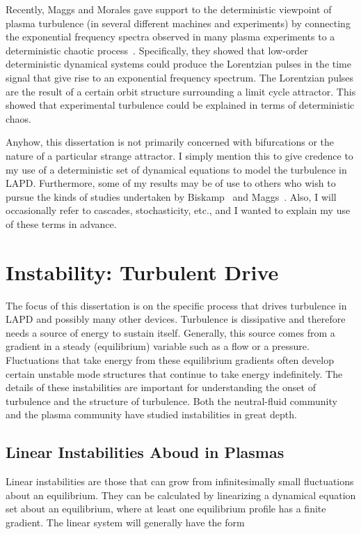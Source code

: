 Recently, Maggs and Morales gave support to the deterministic viewpoint of plasma turbulence (in several different machines and experiments) by connecting the exponential frequency spectra
observed in many plasma experiments to a deterministic chaotic process~\cite{maggs2011,maggs2012a,maggs2012b}. Specifically, they showed that low-order deterministic dynamical systems could
produce the Lorentzian pulses in the time signal that give rise to an exponential frequency spectrum. The Lorentzian pulses are the result of a certain orbit structure surrounding
a limit cycle attractor. This showed that experimental turbulence could be explained in terms of deterministic chaos.

Anyhow, this dissertation is not primarily concerned with bifurcations or the nature of a particular strange attractor. I simply mention this to give credence to my use of a deterministic set
of dynamical equations to model the turbulence in LAPD. Furthermore, some of my results may be of use to others who wish to pursue the kinds of studies undertaken by Biskamp~\cite{biskamp1985}
and Maggs~\cite{maggs2012a}. Also, I will occasionally refer to cascades, stochasticity, etc., and I wanted to explain my use of these terms in advance.


\section{Instability: Turbulent Drive}
\label{s_nlin_stability}

The focus of this dissertation is on the specific process that drives turbulence in LAPD and possibly many other devices. Turbulence is dissipative and therefore needs a source of energy
to sustain itself. Generally, this source comes from a gradient in a steady (equilibrium) variable such as a flow or a pressure. Fluctuations that take energy from these equilibrium
gradients often develop certain unstable mode structures that continue to take energy indefinitely. The details of these instabilities are important for understanding the onset of turbulence
and the structure of turbulence. Both the neutral-fluid community and the plasma community have studied instabilities in great depth.

\subsection{Linear Instabilities Aboud in Plasmas}
\label{s_lin_inst_plasmas}

Linear instabilities are those that can grow from infinitesimally small fluctuations about an equilibrium. They can be calculated by linearizing a dynamical equation set about an equilibrium, where
at least one equilibrium profile has a finite gradient. The linear system will generally have the form

